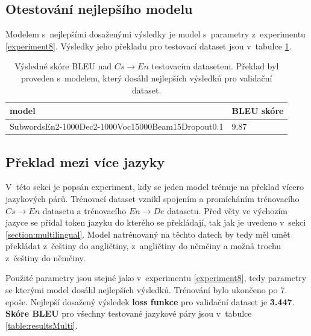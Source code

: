 \subsection{Otestování nejlepšího modelu} \label{experimentBestModel}
Modelem s~nejlepšími dosaženými výsledky je model s~parametry z~experimentu \ref{experiment8}. Výsledky jeho překladu pro testovací dataset jsou v~tabulce \ref{table:bestResults}.

\begin{table}[H]
    \begin{center}
        \begin{tabular}{ll}
          \toprule
          model & BLEU skóre \\
          \midrule
          SubwordsEn2-1000Dec2-1000Voc15000Beam15Dropout0.1 & 9.87 \\
          \bottomrule
        \end{tabular}
    \end{center}
	\caption{Výsledné skóre BLEU nad $Cs\rightarrow En$ testovacím datasetem. Překlad byl proveden s~modelem, který dosáhl nejlepších výsledků pro validační dataset.}
	\label{table:bestResults}
\end{table}


\subsection{Překlad mezi více jazyky} \label{experimentMultiLingual}
V~této sekci je popsán experiment, kdy se jeden model trénuje na překlad vícero jazykových párů. Trénovací dataset vznikl spojením a promícháním trénovacího $Cs\rightarrow En$ datasetu a trénovacího $En\rightarrow De$ datasetu. Před věty ve výchozím jazyce se přidal token jazyku do kterého se překládají, tak jak je uvedeno v~sekci \ref{section:multilingual}. Model natrénovaný na těchto datech by tedy měl umět překládat z~češtiny do angličtiny, z~angličtiny do němčiny a možná trochu z~češtiny do němčiny.

Použité parametry jsou stejné jako v~experimentu \ref{experiment8}, tedy parametry se kterými model dosáhl nejlepších výsledků. Trénování bylo ukončeno po 7. epoše. Nejlepší dosažený výsledek \textbf{loss funkce} pro validační dataset je \textbf{3.447}. \textbf{Skóre BLEU} pro všechny testované jazykové páry jsou v~tabulce \ref{table:resultsMulti}.

